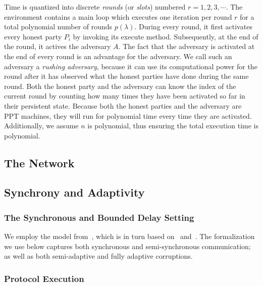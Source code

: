 Time is quantized into discrete \emph{rounds} (or \emph{slots}) numbered $r = 1, 2, 3, \cdots$.
The
environment contains a main loop which executes one iteration per round $r$ for
a total polynomial number of rounds $p(\lambda)$. During
every round, it first activates every honest party $P_i$ by invoking its
\textsf{execute} method. Subsequently, at the end of
the round, it actives the adversary $A$. The fact that the adversary is activated at
the end of every round is an advantage for the adversary. We call such an
adversary a \emph{rushing adversary}, because it can use its computational power
for the round after it has observed what the honest parties have done during the
same round. Both the honest party and the adversary can know the index of the
current round by counting how many times they have been activated so far in
their persistent state. Because both the honest parties and the
adversary are PPT machines, they will run for polynomial time every time they
are activated. Additionally, we assume $n$ is polynomial, thus ensuring the
total execution time is polynomial.

\subsection{The Network}

\subsection{Synchrony and Adaptivity}

\subsubsection{The Synchronous and Bounded Delay Setting}

We employ the model from~\cite{praos}, which is in turn based
on~\cite{ouroboros} and~\cite{backbone}.
The formalization we use below captures both synchronous and semi-syn\-chronous
communication; as well as both semi-adaptive and fully adaptive corruptions.

\subsubsection{Protocol Execution}
\label{sec:prelim-exec}

